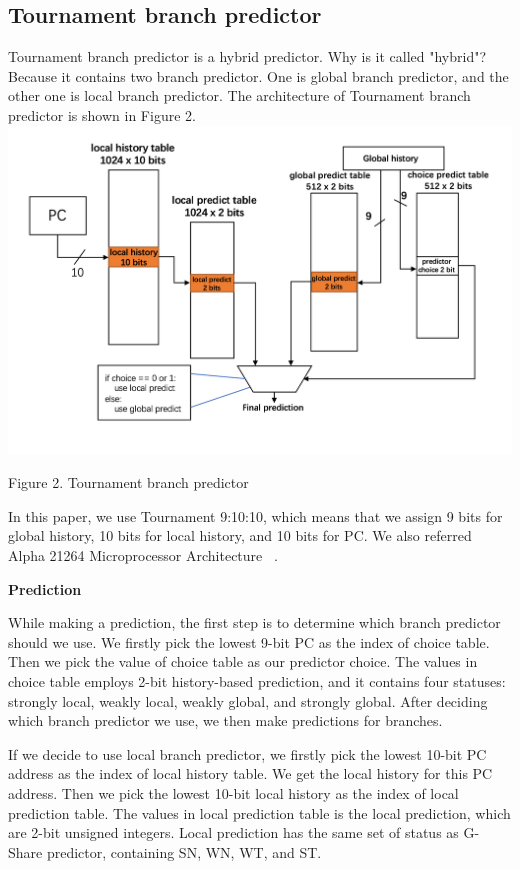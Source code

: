 \documentclass[conference]{IEEEtran}
\begin{document}
\subsection{Tournament branch predictor}
Tournament branch predictor is a hybrid predictor. Why is it called "hybrid"? Because it contains two branch predictor. One is global branch predictor, and the other one is local branch predictor. 
The architecture of Tournament branch predictor is shown in Figure 2. 
\includegraphics[width=\linewidth]{Tournament.png}
\begin{center}
  {\small Figure 2. Tournament branch predictor}
\end{center}
In this paper, we use Tournament 9:10:10, which means that we assign 9 bits for global history, 10 bits for local history, and 10 bits for PC. We also referred Alpha 21264 Microprocessor Architecture ~\cite{nicepaper5}.  

\begin{center}
  \textbf{Prediction}
\end{center}
While making a prediction, the first step is to determine which branch predictor should we use. We firstly pick the lowest 9-bit PC as the index of choice table. Then we pick the value of choice table as our predictor choice. 
The values in choice table employs 2-bit history-based prediction, and it contains four statuses: strongly local, weakly local, weakly global, and strongly global. After deciding which branch predictor we use, we then make predictions for branches. 

If we decide to use local branch predictor, we firstly pick the lowest 10-bit PC address as the index of local history table. 
We get the local history for this PC address. Then we pick the lowest 10-bit local history as the index of local prediction table. The values in local prediction table is the local prediction, which are 2-bit unsigned integers. 
Local prediction has the same set of status as G-Share predictor, containing SN, WN, WT, and ST. 
\end{document}
